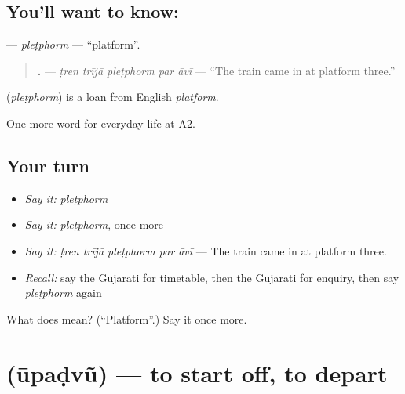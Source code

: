 \subsection*{You'll want to know: }
\textbf{} — \emph{pleṭphorm} — \textquotedblleft{}platform\textquotedblright{}.

\begin{quote}
\textbf{    .} — \emph{ṭren trījā pleṭphorm par āvī} — \textquotedblleft{}The train came in at platform three.\textquotedblright{}
\end{quote}

\begin{cousinweb}
\textbf{} (\emph{pleṭphorm}) is a loan from English \emph{platform}.
\end{cousinweb}

\begin{grammarlens}[title={What you've built}]
One more word for everyday life at A2.
\end{grammarlens}

\subsection*{Your turn}
\begin{itemize}
\raggedright
  \item \emph{Say it:} \emph{pleṭphorm}
  \item \emph{Say it:} \emph{pleṭphorm}, once more
  \item \emph{Say it:} \emph{ṭren trījā pleṭphorm par āvī} — The train came in at platform three.
  \item \emph{Recall:} say the Gujarati for timetable, then the Gujarati for enquiry, then say \emph{pleṭphorm} again
\end{itemize}

\begin{tcolorbox}[breakable,colback=teal!4,colframe=teal!35!black,title={Before you move on}]
What does  mean? (\textquotedblleft{}Platform\textquotedblright{}.) Say it once more.
\end{tcolorbox}
\section[\texorpdfstring{\gu{ઊપડવું} (ūpaḍvũ)}{ઊપડવું (ūpaḍvũ)}]{ (ūpaḍvũ) — to start off, to depart}

\label{lesson:GU-C204-upadvu}



